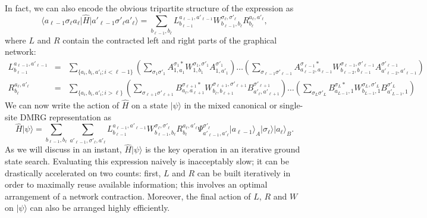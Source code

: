 \documentclass[a4paper,10pt,oneside,onecolumn,1p,times]{elsarticle}
\newcommand{\bra}[1]{\mbox{$\langle #1  |$}}
\newcommand{\ket}[1]{\mbox{$| #1  \rangle$}}
\begin{document}
In fact, we can also encode the obvious tripartite structure of the expression as
\begin{equation}
\bra{a_{\ell-1} \sigma_{\ell} a_{\ell}} \hat{H}  \ket{a'_{\ell-1} \sigma'_{\ell} a'_{\ell}} 
= \sum_{b_{\ell-1}, b_{\ell}} L^{a_{\ell-1},a'_{\ell-1}}_{b_{\ell-1}}  W^{\sigma_{\ell},\sigma'_{\ell}}_{b_{\ell-1},b_{\ell}} R^{a_{\ell},a'_{\ell}}_{b_{\ell}} ,
\end{equation}
where $L$ and $R$ contain the contracted left and right parts of the graphical network: 
\begin{eqnarray}
L^{a_{\ell-1},a'_{\ell-1}}_{b_{\ell-1}} &=& \sum_{\{ a_i, b_i, a'_i; i<\ell-1\} } \left( \sum_{\sigma_1\sigma'_1} A^{\sigma_1*}_{1,a_1} W^{\sigma_1,\sigma'_1}_{1,b_1} A^{\sigma'_1}_{1,a'_1} \right) \ldots \left( \sum_{\sigma_{\ell-1}\sigma'_{\ell-1}} A^{\sigma_{\ell-1} *}_{a_{\ell-2},a_{\ell-1}} W^{\sigma_{\ell-1},\sigma'_{\ell-1}}_{b_{\ell-2},b_{\ell-1}} A^{\sigma'_{\ell-1}}_{a'_{\ell-2},a'_{\ell-1}} \right) 
\label{eq:LdefineinMPO} \\
R^{a_{\ell},a'_{\ell}}_{b_{\ell}} &=& \sum_{\{ a_i, b_i, a'_i; i>\ell\} } 
\left( \sum_{\sigma_{\ell+1}\sigma'_{\ell+1}} B^{\sigma_{\ell+1}*}_{a_{\ell},a_{\ell+1}} W^{\sigma_{\ell+1},\sigma'_{\ell+1}}_{b_{\ell},b_{\ell+1}} B^{\sigma'_{\ell+1}}_{a'_{\ell},a'_{\ell+1}} \right) \ldots \left( \sum_{\sigma_L\sigma'_L} B^{\sigma_L*}_{a_{L-1},1} W^{\sigma_L,\sigma'_L}_{b_{L-1},1} B^{\sigma'_L}_{a'_{L-1},1} \right) 
\end{eqnarray}
We can now write the action of $\hat{H}$ on a state $\ket{\psi}$ in the mixed canonical or single-site DMRG representation as
\begin{equation}
\hat{H}\ket{\psi} = \sum_{b_{\ell-1}, b_{\ell}} \sum_{a'_{\ell-1}, \sigma'_{\ell}, a'_{\ell}}
 L^{a_{\ell-1},a'_{\ell-1}}_{b_{\ell-1}}  W^{\sigma_{\ell},\sigma'_{\ell}}_{b_{\ell-1},b_{\ell}} R^{a_{\ell},a'_{\ell}}_{b_{\ell}} \Psi^{\sigma'_{\ell}}_{a'_{\ell-1},a'_{\ell}} \ket{a_{\ell-1}}_A \ket{\sigma_{\ell}} \ket{a_{\ell}}_B .
\end{equation}
As we will discuss in an instant, $\hat{H}\ket{\psi}$ is the key operation in an iterative ground state search. Evaluating this expression naively is inacceptably slow; it can be drastically accelerated on two counts: first, $L$ and $R$ can be built iteratively in order to maximally reuse available information; this involves an optimal arrangement of a network contraction. Moreover, the final action of $L$, $R$ and $W$ on $\ket{\psi}$ can also be arranged highly efficiently.
\end{document}
